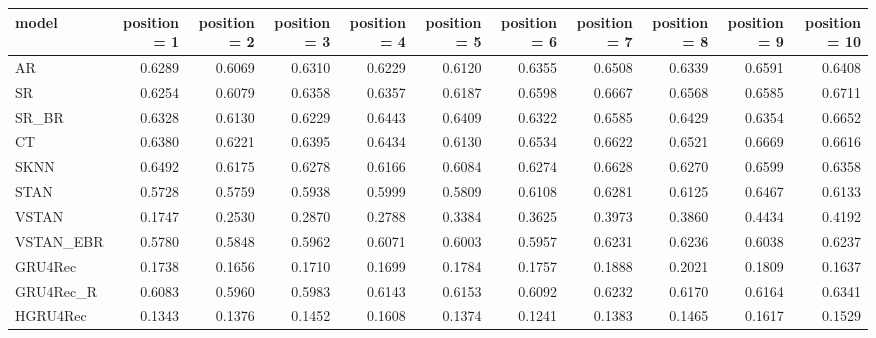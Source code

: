 \begin{tabular}{lrrrrrrrrrr}
\toprule
     model &  position = 1 &  position = 2 &  position = 3 &  position = 4 &  position = 5 &  position = 6 &  position = 7 &  position = 8 &  position = 9 &  position = 10 \\
\midrule
        AR &        0.6289 &        0.6069 &        0.6310 &        0.6229 &        0.6120 &        0.6355 &        0.6508 &        0.6339 &        0.6591 &         0.6408 \\
        SR &        0.6254 &        0.6079 &        0.6358 &        0.6357 &        0.6187 &        0.6598 &        0.6667 &        0.6568 &        0.6585 &         0.6711 \\
     SR\_BR &        0.6328 &        0.6130 &        0.6229 &        0.6443 &        0.6409 &        0.6322 &        0.6585 &        0.6429 &        0.6354 &         0.6652 \\
        CT &        0.6380 &        0.6221 &        0.6395 &        0.6434 &        0.6130 &        0.6534 &        0.6622 &        0.6521 &        0.6669 &         0.6616 \\
      SKNN &        0.6492 &        0.6175 &        0.6278 &        0.6166 &        0.6084 &        0.6274 &        0.6628 &        0.6270 &        0.6599 &         0.6358 \\
      STAN &        0.5728 &        0.5759 &        0.5938 &        0.5999 &        0.5809 &        0.6108 &        0.6281 &        0.6125 &        0.6467 &         0.6133 \\
     VSTAN &        0.1747 &        0.2530 &        0.2870 &        0.2788 &        0.3384 &        0.3625 &        0.3973 &        0.3860 &        0.4434 &         0.4192 \\
 VSTAN\_EBR &        0.5780 &        0.5848 &        0.5962 &        0.6071 &        0.6003 &        0.5957 &        0.6231 &        0.6236 &        0.6038 &         0.6237 \\
   GRU4Rec &        0.1738 &        0.1656 &        0.1710 &        0.1699 &        0.1784 &        0.1757 &        0.1888 &        0.2021 &        0.1809 &         0.1637 \\
 GRU4Rec\_R &        0.6083 &        0.5960 &        0.5983 &        0.6143 &        0.6153 &        0.6092 &        0.6232 &        0.6170 &        0.6164 &         0.6341 \\
  HGRU4Rec &        0.1343 &        0.1376 &        0.1452 &        0.1608 &        0.1374 &        0.1241 &        0.1383 &        0.1465 &        0.1617 &         0.1529 \\
\bottomrule
\end{tabular}
